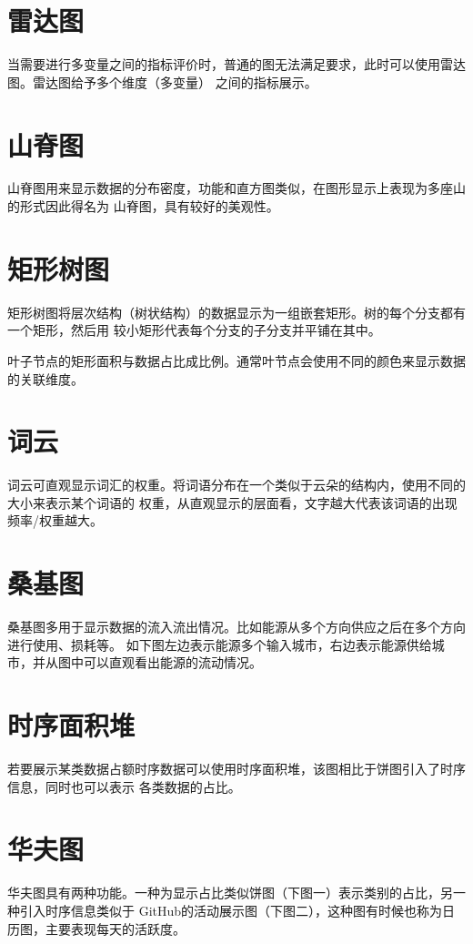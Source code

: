 \documentclass{introduction}
\begin{document}
	\section{雷达图}
	当需要进行多变量之间的指标评价时，普通的图无法满足要求，此时可以使用雷达图。雷达图给予多个维度（多变量）
	之间的指标展示。

	\section{山脊图}
	山脊图用来显示数据的分布密度，功能和直方图类似，在图形显示上表现为多座山的形式因此得名为
	山脊图，具有较好的美观性。\parainterval

	\section{矩形树图}
	矩形树图将层次结构（树状结构）的数据显示为一组嵌套矩形。树的每个分支都有一个矩形，然后用
	较小矩形代表每个分支的子分支并平铺在其中。

	叶子节点的矩形面积与数据占比成比例。通常叶节点会使用不同的颜色来显示数据的关联维度。
	\parainterval

	\newpage
	\section{词云}
	词云可直观显示词汇的权重。将词语分布在一个类似于云朵的结构内，使用不同的大小来表示某个词语的
	权重，从直观显示的层面看，文字越大代表该词语的出现频率/权重越大。\parainterval

	\section{桑基图}
	桑基图多用于显示数据的流入流出情况。比如能源从多个方向供应之后在多个方向进行使用、损耗等。
	如下图左边表示能源多个输入城市，右边表示能源供给城市，并从图中可以直观看出能源的流动情况。
	\parainterval

	\newpage
	\section{时序面积堆}
	若要展示某类数据占额时序数据可以使用时序面积堆，该图相比于饼图引入了时序信息，同时也可以表示
	各类数据的占比。\parainterval

	\section{华夫图}
	华夫图具有两种功能。一种为显示占比类似饼图（下图一）表示类别的占比，另一种引入时序信息类似于
	GitHub的活动展示图（下图二），这种图有时候也称为日历图，主要表现每天的活跃度。\parainterval
	\newline
	
\end{document}
